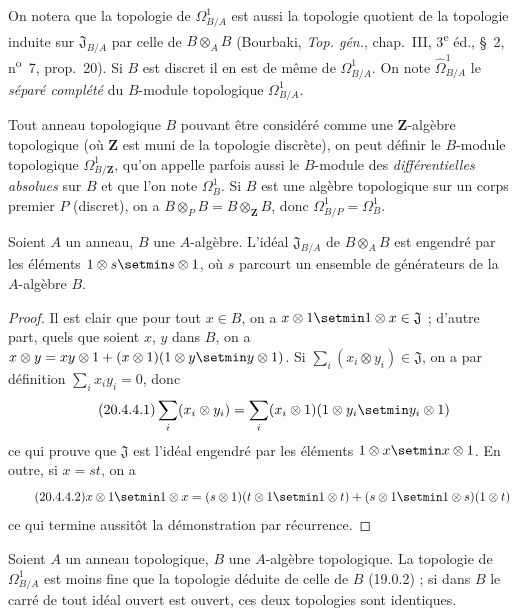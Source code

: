On notera que la topologie de $\Omega^1_{B/A}$ est aussi la topologie quotient
de la topologie induite sur $\mathfrak{J}_{B/A}$ par celle de
$B\otimes_A B$ (Bourbaki, \emph{Top. gén.}, chap.~III, 3\textsuperscript{e}
éd., §~2, n\textsuperscript{o}~7, prop.~20). Si $B$ est discret il en est de
même de $\Omega^1_{B/A}$. On note $\widehat{\Omega}^1_{B/A}$ le
\emph{séparé complété} du $B$-module topologique $\Omega^1_{B/A}$.

Tout anneau topologique $B$ pouvant être considéré comme une
$\mathbf{Z}$-algèbre topologique (où $\mathbf{Z}$ est muni de la topologie
discrète), on peut définir le $B$-module topologique $\Omega^1_{B/\mathbf{Z}}$,
qu'on appelle parfois aussi le $B$-module des \emph{différentielles absolues}
sur $B$ et que l'on note $\Omega^1_B$. Si $B$ est une algèbre topologique sur
un corps premier $P$ (discret), on a
$B\otimes_P B=B\otimes_{\mathbf{Z}}B$, donc
$\Omega^1_{B/P}=\Omega^1_B$.

\begin{lemma}[20.4.4]
\label{0.20.4.4-fr}
Soient $A$ un anneau, $B$ une $A$-algèbre. L'idéal $\mathfrak{J}_{B/A}$ de
$B\otimes_A B$ est engendré par les éléments $1\otimes s\setmin s\otimes1$, où $s$
parcourt un ensemble de générateurs de la $A$-algèbre $B$.
\end{lemma}

\begin{proof}
Il est clair que pour tout $x\in B$, on a
$x\otimes1\setmin 1\otimes x\in\mathfrak{J}$ ; d'autre part, quels que soient $x$,
$y$ dans $B$, on a
$x\otimes y=xy\otimes1+(x\otimes1)(1\otimes y\setmin y\otimes1)$. Si
$\sum_i(x_i\otimes y_i)\in\mathfrak{J}$, on a par définition
$\sum_i x_i y_i=0$, donc
\begin{equation}
\tag{20.4.4.1}
\label{0.20.4.4.1-fr}
  \sum_i(x_i\otimes y_i)=
  \sum_i(x_i\otimes1)(1\otimes y_i\setmin y_i\otimes1)
\end{equation}
ce qui prouve que $\mathfrak{J}$ est l'idéal engendré par les éléments
$1\otimes x\setmin x\otimes1$. En outre, si $x=st$, on a
\begin{equation}
\tag{20.4.4.2}
\label{0.20.4.4.2-fr}
  x\otimes1\setmin 1\otimes x=(s\otimes1)(t\otimes1\setmin 1\otimes t)
  +(s\otimes1\setmin 1\otimes s)(1\otimes t)
\end{equation}
ce qui termine aussitôt la démonstration par récurrence.
\end{proof}

\begin{proposition}[20.4.5]
\label{0.20.4.5-fr}
Soient $A$ un anneau topologique, $B$ une $A$-algèbre topologique. La
topologie de $\Omega^1_{B/A}$ est moins fine que la topologie déduite de celle
de $B$ (19.0.2) ; si dans $B$ le carré de tout idéal ouvert est ouvert, ces
deux topologies sont identiques.
\end{proposition}

